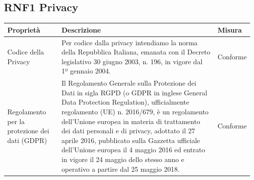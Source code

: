 \documentclass{article}
\begin{document}
\subsection{RNF1 Privacy}
\begin{center}
    \begin{longtable}{|p{4cm}|p{8cm}|p{4cm}|}
        \hline
        Proprietà                                     & Descrizione                                                                                                                                                                                                                                                                                                                                                                                                                                                            & Misura   \\
        \hline
        Codice della Privacy                          & Per codice dalla privacy intendiamo la norma della Repubblica Italiana, emanata con il Decreto legislativo 30 giugno 2003, n. 196, in vigore dal 1º gennaio 2004.                                                                                                                                                                                                                                                                                                      & Conforme \\
        \hline
        Regolamento per la protezione dei dati (GDPR) & Il Regolamento Generale sulla Protezione dei Dati in sigla RGPD (o GDPR in inglese General Data Protection Regulation), ufficialmente regolamento (UE) n. 2016/679, è un regolamento dell'Unione europea in materia di trattamento dei dati personali e di privacy, adottato il 27 aprile 2016, pubblicato sulla Gazzetta ufficiale dell'Unione europea il 4 maggio 2016 ed entrato in vigore il 24 maggio dello stesso anno e operativo a partire dal 25 maggio 2018. & Conforme \\
        \hline
    \end{longtable}
\end{center}
\end{document}
